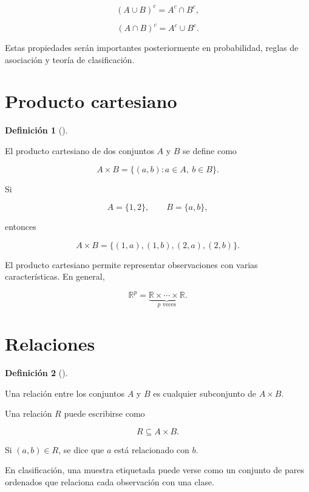 \documentclass[
  spanish,
  11pt,
  letterpaper,
  DIV=11,
  numbers=noendperiod]{scrreprt}
\theoremstyle{definition}
\newtheorem{definition}{Definición}[chapter]
\theoremstyle{plain}
\theoremstyle{definition}
\theoremstyle{remark}
\begin{document}
\[
(A\cup B)^c=A^c\cap B^c,
\]

\[
(A\cap B)^c=A^c\cup B^c.
\]

Estas propiedades serán importantes posteriormente en probabilidad,
reglas de asociación y teoría de clasificación.

\section{Producto cartesiano}\label{producto-cartesiano}

\begin{definition}[]\protect\hypertarget{def-producto-cartesiano}{}\label{def-producto-cartesiano}

El producto cartesiano de dos conjuntos \(A\) y \(B\) se define como

\[
A\times B
=
\{(a,b):a\in A,\ b\in B\}.
\]

\end{definition}

Si

\[
A=\{1,2\},
\qquad
B=\{a,b\},
\]

entonces

\[
A\times B
=
\{(1,a),(1,b),(2,a),(2,b)\}.
\]

El producto cartesiano permite representar observaciones con varias
características. En general,

\[
\mathbb{R}^{p}
=
\underbrace{
\mathbb{R}\times\cdots\times\mathbb{R}
}_{p\text{ veces}}.
\]

\section{Relaciones}\label{relaciones}

\begin{definition}[]\protect\hypertarget{def-relacion}{}\label{def-relacion}

Una relación entre los conjuntos \(A\) y \(B\) es cualquier subconjunto
de \(A\times B\).

\end{definition}

Una relación \(R\) puede escribirse como

\[
R\subseteq A\times B.
\]

Si \((a,b)\in R\), se dice que \(a\) está relacionado con \(b\).

En clasificación, una muestra etiquetada puede verse como un conjunto de
pares ordenados que relaciona cada observación con una clase.
\end{document}
